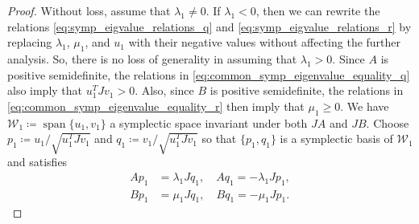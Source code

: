 \documentclass[preprint,12pt]{elsarticle}
\begin{document}
\begin{proof}
    Without loss, assume that $\lambda_1 \neq 0$.
    If $\lambda_1 < 0$, then we can rewrite the relations \eqref{eq:symp_eigvalue_relations_q} and \eqref{eq:symp_eigvalue_relations_r} by replacing $\lambda_1$, $\mu_1$, and $u_1$ with their negative values without affecting the further analysis.
    So, there is no loss of generality in assuming that $\lambda_1 >0$.
    Since $A$ is positive semidefinite, the relations in \eqref{eq:common_symp_eigenvalue_equality_q} also imply that $ u_1^T Jv_1 > 0$.
    Also, since $B$ is positive semidefinite, the relations in  \eqref{eq:common_symp_eigenvalue_equality_r} then imply that $\mu_1 \geq 0$.
    We have $\mathscr{W}_1 \coloneqq \operatorname{span}\{u_1, v_1\}$ a symplectic space invariant under both $JA$ and $JB$.
    Choose $p_1 \coloneqq  u_1/\sqrt{u_1^TJ v_1}$ and $q_1 \coloneqq  v_1/\sqrt{u_1^TJ v_1}$ so that $\{p_1, q_1\}$ is a symplectic basis of $\mathscr{W}_1$ and satisfies
    \begin{align}
        A p_1  &= \lambda_1 J q_1, \quad A q_1 =  - \lambda_1 J p_1, \label{eq:symp_eigvalue_relations_q-normalized} \\
        B p_1 &= \mu_1 J q_1, \quad B q_1 =  -\mu_1 J p_1.\label{eq:symp_eigvalue_relations_r-normalized}
    \end{align}


\end{proof}
\end{document}
